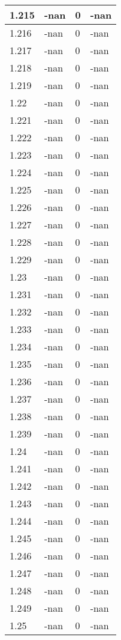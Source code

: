 \documentclass[a4paper,14pt]{extarticle}
\begin{document}
\begin{longtable}{||m{3cm}||m{3cm}|m{3cm}||m{3cm}||}
\hline
1.215 & -nan & 0 & -nan\\
\hline
1.216 & -nan & 0 & -nan\\
\hline
1.217 & -nan & 0 & -nan\\
\hline
1.218 & -nan & 0 & -nan\\
\hline
1.219 & -nan & 0 & -nan\\
\hline
1.22 & -nan & 0 & -nan\\
\hline
1.221 & -nan & 0 & -nan\\
\hline
1.222 & -nan & 0 & -nan\\
\hline
1.223 & -nan & 0 & -nan\\
\hline
1.224 & -nan & 0 & -nan\\
\hline
1.225 & -nan & 0 & -nan\\
\hline
1.226 & -nan & 0 & -nan\\
\hline
1.227 & -nan & 0 & -nan\\
\hline
1.228 & -nan & 0 & -nan\\
\hline
1.229 & -nan & 0 & -nan\\
\hline
1.23 & -nan & 0 & -nan\\
\hline
1.231 & -nan & 0 & -nan\\
\hline
1.232 & -nan & 0 & -nan\\
\hline
1.233 & -nan & 0 & -nan\\
\hline
1.234 & -nan & 0 & -nan\\
\hline
1.235 & -nan & 0 & -nan\\
\hline
1.236 & -nan & 0 & -nan\\
\hline
1.237 & -nan & 0 & -nan\\
\hline
1.238 & -nan & 0 & -nan\\
\hline
1.239 & -nan & 0 & -nan\\
\hline
1.24 & -nan & 0 & -nan\\
\hline
1.241 & -nan & 0 & -nan\\
\hline
1.242 & -nan & 0 & -nan\\
\hline
1.243 & -nan & 0 & -nan\\
\hline
1.244 & -nan & 0 & -nan\\
\hline
1.245 & -nan & 0 & -nan\\
\hline
1.246 & -nan & 0 & -nan\\
\hline
1.247 & -nan & 0 & -nan\\
\hline
1.248 & -nan & 0 & -nan\\
\hline
1.249 & -nan & 0 & -nan\\
\hline
1.25 & -nan & 0 & -nan\\

\end{longtable}
\end{document}
